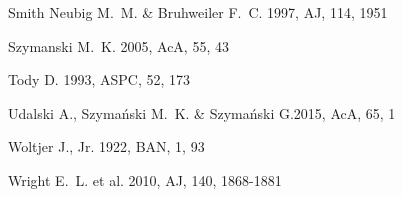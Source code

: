 \documentclass[useAMS,usenatbib]{mn2e}
\begin{document}
\begin{thebibliography}{}




 Smith Neubig M.~M. \& Bruhweiler F.~C. 1997, AJ, 114, 1951 


 Szymanski M.~K. 2005, AcA, 55, 43 


 Tody D. 1993, ASPC, 52, 173 

 Udalski A., Szyma{\'n}ski M.~K. \& Szyma{\'n}ski G.2015, AcA, 65, 1 


 Woltjer J., Jr. 1922, BAN, 1, 93 

 Wright E.~L. et al. 2010, AJ, 140, 1868-1881 





\end{thebibliography}
\bsp 
\label{lastpage}

\newpage
\end{document}

